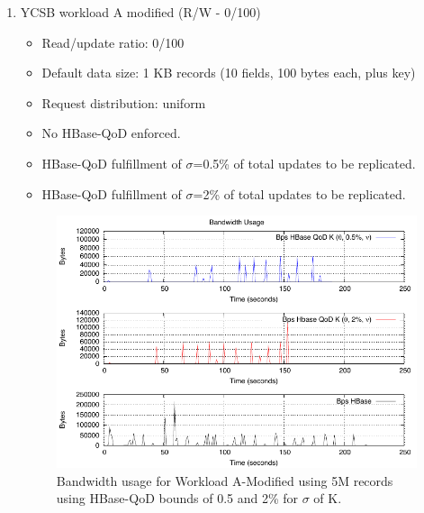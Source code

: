 \begin{enumerate}
Figure~\ref{fig-bandwidth-worloada} shows the results of three different sets of quality-of-data for \emph{workload A}. During the execution of the workload A, in Figure~\ref{fig-bandwidth-worloada}, the highest peaks in replication traffic are observed without any type of HBase-QoD, i.e. just using plain HBase. This is due to the nature of eventual consistency itself, and the internal buffering mechanisms in HBase. Naturally, without HBase-QoD updates are being replicated such as in best-effort~\footnote{Best-Effort delivery, http://en.wikipedia.org/wiki/Best-effort\_delivery} scenarios, where there is an unbounded limit on the number of updates shipped at a time and usually no data-semantics on which ones first or later. Therefore, the module here presented can adapt these limitations in cases of high traffic-loads, choosing first what matters more also.


\item{YCSB workload A modified (R/W - 0/100)}
	\begin{itemize}
	\item Read/update ratio: 0/100
	\item Default data size: 1 KB records (10 fields, 100 bytes each, plus key)
	\item Request distribution: uniform
	\item No HBase-QoD enforced.
	\item HBase-QoD fulfillment of $\sigma$=0.5\% of total updates to be replicated.	%
	\item HBase-QoD fulfillment of $\sigma$=2\% of total updates to be replicated.  %
	\end{itemize}


\begin{figure}
\centering
\includegraphics[scale=1.3]{figs/plot-packets-size-workloada-modified-allbounds-latest.pdf}
\caption{Bandwidth usage for Workload A-Modified using 5M records using HBase-QoD bounds of 0.5 and 2\% for $\sigma$ of K.}
\label{fig-bandwidth-worloada-modified}
\end{figure}


\end{enumerate}
